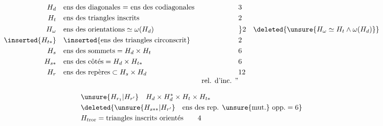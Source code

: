 \[
\begin{aligned}
H_d&\quad\text{ens des diagonales = ens des codiagonales} &&3\\
H_t&\quad\text{ens des triangles inscrits} &&2\\
H_\omega&\quad\text{ens des orientations}\simeq\omega(H_d) &&\big\}2\quad\deleted{\unsure{H_\omega\simeq H_t\wedge\omega(H_d)}}\\
\inserted{H_{t*}}&\quad\inserted{\text{ens des triangles circonscrit}} &&2\\
H_s&\quad\text{ens des sommets}=H_d\times H_t &&6\\
H_{s*}&\quad\text{ens des côtés}=H_d\times H_{t*} &&6\\
H_r&\quad\text{ens des repères}\subset H_s\times H_d &&12\\[-3pt]
&&\text{rel. d'inc. }\text{''}&
\end{aligned}
\]

\[
\begin{aligned}
&\unsure{H_{r_1}|H_{r'}}\quad H_d\times H_d^{*}\times H_t\times H_{t*}\\
&\deleted{\unsure{H_{s**}|H_{r'}}\quad\text{ens des rep. \unsure{mut.} opp.}=6}\\
&H_{t\mathrm{ror}}=\text{triangles inscrits orientés}\qquad 4
\end{aligned}
\]

